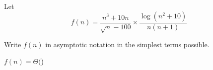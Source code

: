 \begin{prob}
    Let
    \[
        f(n) =
        \frac{n^3 + 10 n}{\sqrt{n} - 100}
        \times
        \frac{ \log(n^2 + 10)} {n(n+1)}
    \]

    Write $f(n)$ in asymptotic notation in the simplest terms possible.

    $f(n) = \Theta($)

\end{prob}
